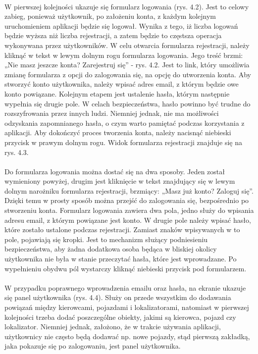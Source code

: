 \paragraph{}
W pierwszej kolejności ukazuje się formularz logowania (rys. 4.2). Jest to celowy zabieg, ponieważ użytkownik, po założeniu konta, z każdym kolejnym uruchomieniem aplikacji będzie się logował. Wynika z tego, iż liczba logowań będzie wyższa niż liczba rejestracji, a zatem będzie to częstsza operacja wykonywana przez użytkowników. W celu otwarcia formularza rejestracji, należy kliknąć w tekst w lewym dolnym rogu formularza logowania. Jego treść brzmi: „Nie masz jeszcze konta? Zarejestruj się” - rys. 4.2. Jest to link, który umożliwia zmianę formularza z opcji do zalogowania się, na opcję do utworzenia konta. Aby stworzyć konto użytkownika, należy wpisać adres email, z którym będzie owe konto powiązane. Kolejnym etapem jest ustalenie hasła, którym następnie wypełnia się drugie pole. W celach bezpieczeństwa, hasło powinno być trudne do rozszyfrowania przez innych ludzi. Niemniej jednak, nie ma możliwości odzyskania zapomnianego hasła, o czym warto pamiętać podczas korzystania z aplikacji. Aby dokończyć proces tworzenia konta, należy nacisnąć niebieski przycisk w prawym dolnym rogu. Widok formularza rejestracji znajduje się na rys. 4.3.

\paragraph{}
Do formularza logowania można dostać się na dwa sposoby. Jeden został wymieniony powyżej, drugim jest kliknięcie w tekst znajdujący się w lewym dolnym narożniku formularza rejestracji, brzmiący: „Masz już konto? Zaloguj się”. Dzięki temu w prosty sposób można przejść do zalogowania się, bezpośrednio po stworzeniu konta. Formularz logowania zawiera dwa pola, jedno służy do wpisania adresu email, z którym powiązane jest konto. W drugie pole należy wpisać hasło, które zostało ustalone podczas rejestracji. Zamiast znaków wpisywanych w to pole, pojawiają się kropki. Jest to mechanizm służący podniesieniu bezpieczeństwa, aby żadna dodatkowa osoba będąca w bliskiej okolicy użytkownika nie była w stanie przeczytać hasła, które jest wprowadzane. Po wypełnieniu obydwu pól wystarczy kliknąć niebieski przycisk pod formularzem.

\paragraph{}
W przypadku poprawnego wprowadzenia emailu oraz hasła, na ekranie ukazuje się panel użytkownika (rys. 4.4). Służy on przede wszystkim do dodawania powiązań między kierowcami, pojazdami i lokalizatorami, natomiast w pierwszej kolejności trzeba dodać poszczególne obiekty, jakimi są kierowca, pojazd czy lokalizator. Niemniej jednak, założono, że w trakcie używania aplikacji, użytkownicy nie często będą dodawać np. nowe pojazdy, stąd pierwszą zakładką, jaka pokazuje się po zalogowaniu, jest panel użytkownika. 

